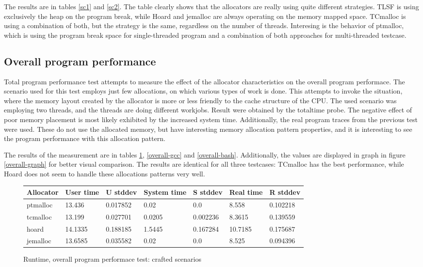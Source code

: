 The results are in tables \ref{sc1} and \ref{sc2}. The table clearly shows that the allocators are really using quite different strategies. TLSF is using exclusively the heap on the program break, while Hoard and jemalloc are always operating on the memory mapped space. TCmalloc is using a combination of both, but the strategy is the same, regardless on the number of threads. Interesing is the behavior of ptmalloc, which is using the program break space for single-threaded program and a combination of both approaches for multi-threaded testcase.

\subsection{Overall program performance}

Total program performance test attempts to measure the effect of the allocator characteristics on the overall program performace. The scenario used for this test employs just few allocations, on which various types of work is done. This attempts to invoke the situation, where the memory layout created by the allocator is more or less friendly to the cache structure of the CPU. The used scenario was employing two threads, and the threads are doing different workjobs. Result were obtained by the totaltime probe. The negative effect of poor memory placement is most likely exhibited by the increased system time. Additionally, the real program traces from the previous test were used. These do not use the allocated memory, but have interesting memory allocation pattern properties, and it is interesting to see the program performance with this allocation pattern.

The results of the measurement are in tables \ref{overall}, \ref{overall-gcc} and \ref{overall-bash}. Additionally, the values are displayed in graph in figure \ref{overall-graph} for better visual comparison. The results are identical for all three testcases: TCmalloc has the best performance, while Hoard does not seem to handle these allocations patterns very well.

\begin{figure}[h]
\begin{center}
\begin{tabular}{|l|l|l|l|l|l|l|}
\hline
Allocator & User time & U stddev & System time & S stddev & Real time & R stddev \\
\hline \hline
ptmalloc & 13.436 & 0.017852 & 0.02 & 0.0 & 8.558 & 0.102218 \\ \hline
tcmalloc & 13.199 & 0.027701 & 0.0205 & 0.002236 & 8.3615 & 0.139559 \\ \hline
hoard & 14.1335 & 0.188185 & 1.5445 & 0.167284 & 10.7185 & 0.175687 \\ \hline
jemalloc & 13.6585 & 0.035582 & 0.02 & 0.0 & 8.525 & 0.094396 \\ \hline
\end{tabular}
\caption{Runtime, overall program performace test: crafted scenarios}
\label{overall}
\end{center}
\end{figure}

